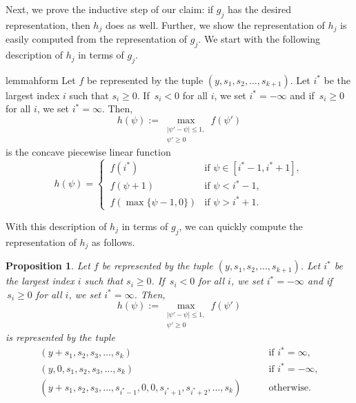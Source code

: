 \documentclass[10pt]{article}
\newtheorem{proposition}{Proposition}
\begin{document}
Next, we prove the inductive step of our claim: if $g_j$ has the desired representation, 
then $h_j$ does as well. Further,
we show the representation of $h_j$ is easily computed from the representation of $g_j$. 
We start with the following description of $h_j$ in terms of $g_j$.
\begin{restatable}{lemma}{hform}
\label{lemma:h_form}
Let $f$ be represented by the tuple $(y, s_1, s_2, \ldots, s_{k + 1})$. 
Let $i^*$ be the largest index $i$ such that $s_i \geq 0$. If $\,s_i < 0$ for all $i$, we set $i^* = -\infty$ and 
if $\,s_i \geq 0$ for all $i$, we set $i^* = \infty$. Then,
\[h(\psi) := \max_{\substack{\lvert \psi' - \psi \rvert \leq 1,\\\psi' \geq 0}} f(\psi')\] is the concave
piecewise linear function
\begin{equation}
    \label{eq:h_form}
    h(\psi) = \begin{cases}
        \,f(i^*) &\text{if } \psi \in [i^* - 1, i^* + 1],\\
        \,f(\psi + 1) &\text{if } \psi < i^* - 1,\\
        \,f(\max\{\psi - 1, 0\}) &\text{if } \psi > i^* + 1.
    \end{cases}
\end{equation}
\end{restatable}
With this description of $h_j$ in terms of $g_j$, we can quickly compute the representation of $h_j$ as 
follows.
\begin{proposition}
    \label{prop:h_form}
    Let $f$ be represented by the tuple $(y, s_1, s_2, \ldots, s_{k + 1})$. Let $i^*$ be the largest index $i$ such that $s_i \geq 0$. 
    If $\,s_i < 0$ for all $i$, we set $i^* = -\infty$ and if $\,s_i \geq 0$ for all $i$, we set $i^* = \infty$.
    Then, \[h(\psi) := \max_{\substack{\lvert \psi' - \psi \rvert \leq 1,\\\psi' \geq 0}} f(\psi')\]
    is represented by the tuple
    \begin{align*}
        (y + s_1, s_2, s_3, \ldots, s_k) \qquad&\text{if } i^* = \infty,\\
        (y, 0, s_1, s_2, s_3, \ldots, s_k) \qquad&\text{if } i^* = -\infty,\\
        (y + s_1, s_2, s_3, \ldots, s_{i^* - 1}, 0, 0, s_{i^* + 1}, s_{i^* + 2}, \ldots, s_k) \qquad&\text{otherwise}.
    \end{align*}
\end{proposition}
\end{document}

